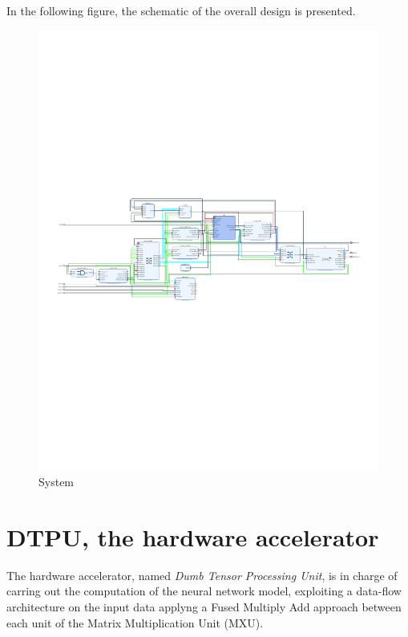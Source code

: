 \newpage
In the following figure, the schematic of the overall design is presented.
\begin{figure}[!htbp]
\centering
\captionsetup{justification=centering}
\includegraphics[scale=0.97,angle=90]{./figure/system_schematic.pdf}
\caption{System}
\label{fig:sys}
\end{figure}

\section{DTPU, the hardware accelerator}
The hardware accelerator, named \textit{ Dumb Tensor Processing Unit}, is in charge of carring out the computation of the neural network model, exploiting a data-flow architecture on the input data applyng a Fused Multiply Add approach between each unit of the Matrix Multiplication Unit (MXU).

